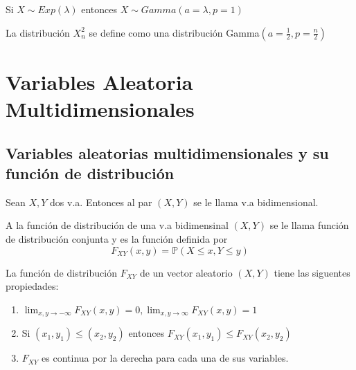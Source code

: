 \begin{obs}
Si $X\sim Exp(\lambda)$ entonces $X\sim Gamma(a=\lambda,p=1)$
\end{obs}

\begin{obs}
La distribución $X_n^2$ se define como una distribución Gamma$(a=\frac{1}{2},p=\frac{n}{2})$
\end{obs}

\begin{ejr}[2.26 , Schaum]

\end{ejr}

\begin{ejr}

\end{ejr}



\chapter{Variables Aleatoria Multidimensionales}
\section{Variables aleatorias multidimensionales y su función de distribución}

\begin{defn}
Sean $X,Y$ dos v.a. Entonces al par $(X,Y)$ se le llama v.a bidimensional.
\end{defn}

\begin{defn}
A la función de distribución de una v.a bidimensinal $(X,Y)$ se le llama función de distribución conjunta y es la función definida por \[ F_{XY} (x,y) = \mathbb{P}(X\leq x, Y\leq y) \]
\end{defn}

\begin{prop}
La función de distribución $F_{XY}$ de un vector aleatorio $(X,Y)$ tiene las siguentes propiedades:

\begin{enumerate}[label=(\roman*)]
    \item $\lim_{x,y\rightarrow -\infty} F_{XY}(x,y) = 0,  \lim_{x,y\rightarrow \infty} F_{XY}(x,y) = 1$
    \item Si $(x_1,y_1)\leq(x_2,y_2)$ entonces $F_{XY}(x_1,y_1)\leq F_{XY}(x_2,y_2)$
    \item $F_{XY}$ es continua por la derecha para cada una de sus variables.
\end{enumerate}
\end{prop}

